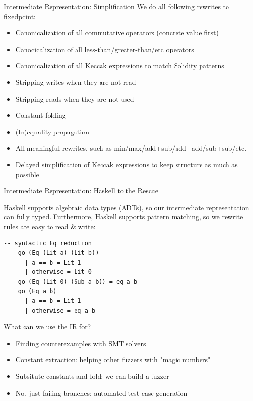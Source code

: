 \documentclass[aspectratio=169]{beamer}
\begin{document}
\begin{frame}[fragile=singleslide]{Intermediate Representation: Simplification} 
We do all following rewrites to fixedpoint:
\begin{itemize}
\item Canonicalization of all commutative operators (concrete value first)
\item Canocicalization of all less-than/greater-than/etc operators
\item Canonicalization of all Keccak expressions to match Solidity patterns
\item Stripping writes when they are not read
\item Stripping reads when they are not used
\item Constant folding
\item (In)equality propagation
\item All meaningful rewrites, such as min/max/add+sub/add+add/sub+sub/etc.
\item Delayed simplification of Keccak expressions to keep structure as much as possible
\end{itemize}
\end{frame}

\begin{frame}[fragile=singleslide]{Intermediate Representation: Haskell to the Rescue}

Haskell supports algebraic data types (ADTs), so our intermediate representation can fully typed. Furthermore, Haskell supports pattern matching, so we rewrite rules are easy to read \& write:
\begin{Verbatim}[frame=single, framerule=0.2mm, framesep=2mm,fontsize=\small]
    -- syntactic Eq reduction
    go (Eq (Lit a) (Lit b))
      | a == b = Lit 1
      | otherwise = Lit 0
    go (Eq (Lit 0) (Sub a b)) = eq a b
    go (Eq a b)
      | a == b = Lit 1
      | otherwise = eq a b
\end{Verbatim}
\end{frame}

\begin{frame}[fragile=singleslide]{What can we use the IR for?}
\begin{itemize}
\item Finding counterexamples with SMT solvers
\item Constant extraction: helping other fuzzers with "magic numbers"
\item Subsitute constants and fold: we can build a fuzzer
\item Not just failing branches: automated test-case generation
\end{itemize}

\end{frame}
\end{document}
